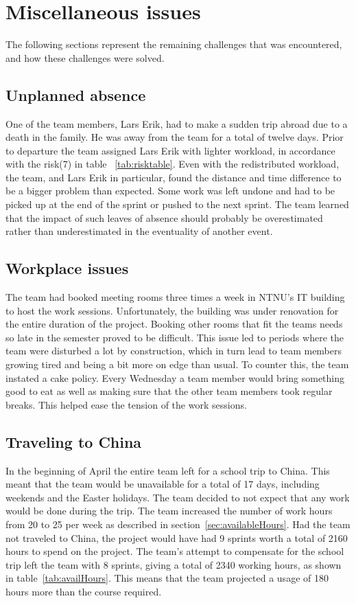 \section{Miscellaneous issues}
The following sections represent the remaining challenges that was encountered, and how these challenges were solved.

\subsection{Unplanned absence}
One of the team members, Lars Erik, had to make a sudden trip abroad due to a death in the family. He was away from the team for a total of twelve days. Prior to departure the team assigned Lars
Erik with lighter workload, in accordance with the risk(7) in table ~\ref{tab:risktable}. Even with the redistributed workload, the team, and Lars Erik in particular, found the distance and time difference to
be a bigger problem than expected. Some work was left undone and had to be picked up at the end of the sprint or pushed to the next sprint. The team learned that the impact of such leaves of absence should probably be overestimated rather than underestimated in the eventuality of another event.

\subsection{Workplace issues}
The team had booked meeting rooms three times a week in NTNU's IT building to host the work sessions. Unfortunately, the building was under renovation for the entire duration of the project. Booking other rooms that fit the teams needs so late in the semester proved to be difficult. This issue led to periods where the team were disturbed a lot by construction, which in turn lead to team members growing tired and being a bit more on edge than usual. To counter this, the team instated a cake policy. Every Wednesday a team member would bring something good to eat as well as making sure that the other team members took regular breaks. This helped ease the tension of the work sessions.

\subsection{Traveling to China}
In the beginning of April the entire team left for a school trip to China. This meant that the team would be unavailable for a total of 17 days, including weekends and the Easter holidays. The team decided to not expect that any work would be done during the trip. The team increased the number of work hours from 20 to 25 per week as described in section~\ref{sec:availableHours}.
Had the team not traveled to China, the project would have had 9 sprints worth a total of 2160 hours to spend on the project. The team's attempt to compensate for the school trip left the team with 8 sprints, giving a total of 2340 working hours, as shown in table~\ref{tab:availHours}. This means that the team projected a usage of 180 hours more than the course required.
